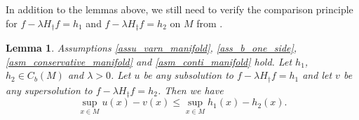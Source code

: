 \documentclass[a4paper]{article}
\numberwithin{equation}{section}
\newtheorem{lemma}[theorem]{Lemma}
\theoremstyle{definition}
\begin{document}
In addition to the lemmas above,  we still need to verify the comparison principle for $f-\lambda H_\dagger f=h_1$ and $f-\lambda H_\ddagger f=h_2$ on $M$ from .

\begin{lemma}\label{Hd}
Assumptions \ref{assu_varn_manifold}, \ref{ass_b_one_side}, \ref{asm_conservative_manifold} and \ref{asm_conti_manifold} hold. Let $h_1$, $h_2\in C_b(M)$ and $\lambda>0$. Let $u$ be any subsolution to $f-\lambda H_{\dagger}f=h_1$ and let $v$ be any supersolution to $f-\lambda H_{\ddagger}f=h_2$. Then we have
\begin{equation}\label{eqn:results_comparison_principle}
\sup_{x\in M}u(x)-v(x)\leq\sup_{x\in M}h_1(x)-h_2(x).
\end{equation}
\end{lemma}
\end{document}

